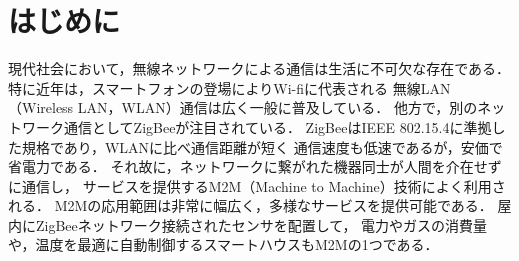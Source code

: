\documentclass[technicalreport]{ieicej}
\begin{document}
\maketitle

\section{はじめに}
\label{sec:intro}



現代社会において，無線ネットワークによる通信は生活に不可欠な存在である．
特に近年は，スマートフォンの登場によりWi-fiに代表される
無線LAN（Wireless LAN，WLAN）通信は広く一般に普及している．
他方で，別のネットワーク通信としてZigBeeが注目されている．
ZigBeeはIEEE 802.15.4に準拠した規格であり，WLANに比べ通信距離が短く
通信速度も低速であるが，安価で省電力である．
それ故に，ネットワークに繋がれた機器同士が人間を介在せずに通信し，
サービスを提供するM2M（Machine to Machine）技術によく利用される．
M2Mの応用範囲は非常に幅広く，多様なサービスを提供可能である．
屋内にZigBeeネットワーク接続されたセンサを配置して，
電力やガスの消費量や，温度を最適に自動制御するスマートハウスもM2Mの1つである．
\end{document}
